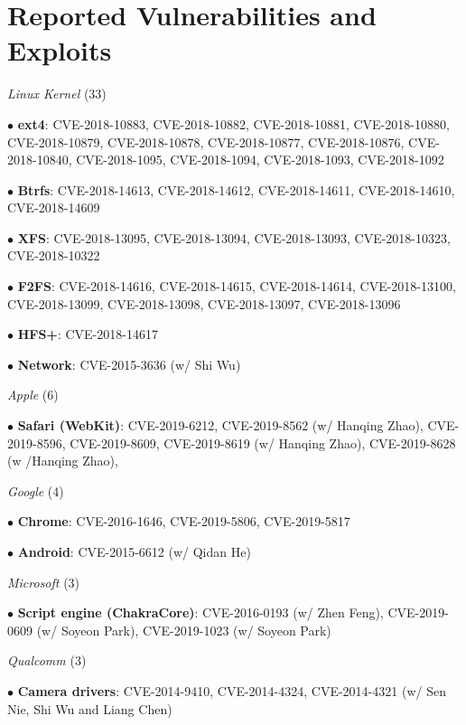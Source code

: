 \section*{Reported Vulnerabilities and Exploits}
\begin{description}
\item {\emph{Linux Kernel} (33)}
    \item $\bullet$ \textbf{ext4}: CVE-2018-10883, CVE-2018-10882, CVE-2018-10881, CVE-2018-10880, CVE-2018-10879, CVE-2018-10878, CVE-2018-10877, CVE-2018-10876, CVE-2018-10840, CVE-2018-1095, CVE-2018-1094, CVE-2018-1093, CVE-2018-1092
    \item $\bullet$ \textbf{Btrfs}: CVE-2018-14613, CVE-2018-14612, CVE-2018-14611, CVE-2018-14610, CVE-2018-14609
    \item $\bullet$ \textbf{XFS}: CVE-2018-13095, CVE-2018-13094, CVE-2018-13093, CVE-2018-10323, CVE-2018-10322
    \item $\bullet$ \textbf{F2FS}: CVE-2018-14616, CVE-2018-14615, CVE-2018-14614, CVE-2018-13100, CVE-2018-13099, CVE-2018-13098, CVE-2018-13097, CVE-2018-13096
	\item $\bullet$ \textbf{HFS+}: CVE-2018-14617
	\item $\bullet$ \textbf{Network}: CVE-2015-3636 (w/ Shi Wu)

\item {\emph{Apple} (6)}
    \item $\bullet$ \textbf{Safari (WebKit)}: CVE-2019-6212, CVE-2019-8562 (w/ Hanqing Zhao), CVE-2019-8596, CVE-2019-8609, CVE-2019-8619 (w/ Hanqing Zhao), CVE-2019-8628 (w /Hanqing Zhao), 

\item {\emph{Google} (4)}
    \item $\bullet$ \textbf{Chrome}: CVE-2016-1646, CVE-2019-5806, CVE-2019-5817
	\item $\bullet$ \textbf{Android}: CVE-2015-6612 (w/ Qidan He)

\item {\emph{Microsoft} (3)}
	\item $\bullet$ \textbf{Script engine (ChakraCore)}: CVE-2016-0193 (w/ Zhen Feng), CVE-2019-0609 (w/ Soyeon Park), CVE-2019-1023 (w/ Soyeon Park)

\item {\emph{Qualcomm} (3)}
	\item $\bullet$ \textbf{Camera drivers}: CVE-2014-9410, CVE-2014-4324, CVE-2014-4321 (w/ Sen Nie, Shi Wu and Liang Chen)
\end{description}

